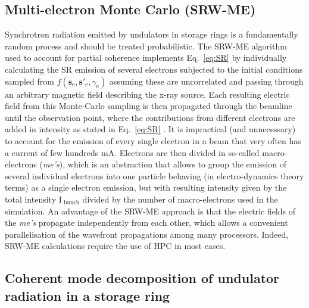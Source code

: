 \documentclass{iucr}              %
\begin{document}
\subsection{Multi-electron Monte Carlo (SRW-ME)}

Synchrotron radiation emitted by undulators in storage rings is a fundamentally random process and should be treated probabilistic. The SRW-ME algorithm used to account for partial coherence implements Eq.~\ref{eq:SR} by individually calculating the SR emission of several electrons subjected to the initial conditions sampled from $f(\textbf{s}_\text{e}, \textbf{s}'_\text{e}, \gamma_\text{e})$ assuming these are uncorrelated and passing through an arbitrary magnetic field describing the x-ray source. Each resulting electric field from this Monte-Carlo sampling is then propagated through the beamline until the observation point, where the contributions from different electrons are added in intensity as stated in Eq.~\ref{eq:SR} \cite{codeSRW_ME}. It is impractical (and unnecessary) to account for the emission of every single electron in a beam that very often has a current of few hundreds mA. Electrons are then divided in so-called macro-electrons (\textit{me's}), which is an abstraction that allows to group the emission of several individual electrons into one particle behaving (in electro-dynamics theory terms) as a single electron emission, but with resulting intensity given by the total intensity $\text{I}_\text{~bunch}$ divided by the number of macro-electrons used in the simulation. An advantage of the SRW-ME approach is that the electric fields of the \textit{me's} propagate independently from each other, which allows a convenient parallelisation of the wavefront propagations among many processors. Indeed, SRW-ME calculations require the use of HPC in most cases.

\subsection{Coherent mode decomposition of undulator radiation in a storage ring}\label{sec:CMD}
\end{document}
